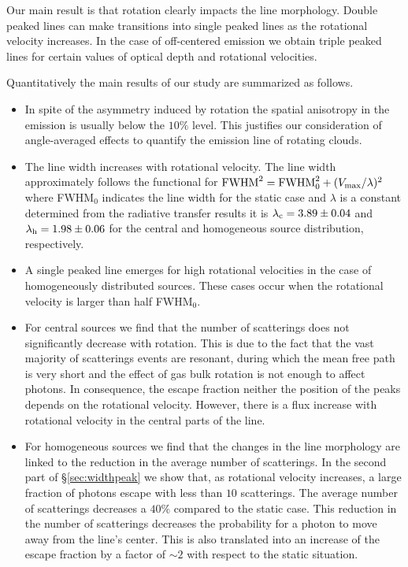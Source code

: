 \documentclass{emulateapj}
\newcommand{\ly}{{\ifmmode{{\rm Ly}\alpha~}\else{Ly$\alpha$~}\fi}}
\begin{document}
Our main result is that rotation clearly impacts the \ly line
morphology. Double peaked lines can make transitions into single
peaked lines as the rotational velocity increases. In the case of
off-centered emission we obtain triple peaked lines for certain
values of optical depth and rotational velocities. 

Quantitatively the main results of our study are summarized as follows.

\begin{itemize}

\item In spite of the asymmetry induced by rotation the spatial
  anisotropy in the emission is usually below the
  $10\%$ level. This justifies our consideration of angle-averaged
  effects to quantify the emission line of rotating clouds. 

\item The line width increases with rotational velocity. The line width
  approximately follows the functional for  ${\rm FWHM}^2 = {\rm FWHM}_{
    0}^2 + (V_{\rm max}/\lambda)^2$ where FWHM$_{0}$ indicates the line
  width for the static case and $\lambda$ is a constant determined from
  the radiative transfer results it is $\lambda_{\rm c}=3.89\pm0.04$ and
  $\lambda_{\rm h}=1.98\pm0.06$ for the central and homogeneous source
  distribution, respectively.

\item A single peaked line emerges for high rotational velocities in
  the case of homogeneously distributed sources. These cases occur when
  the rotational velocity is larger than half FWHM$_0$.  

\item For central sources we find that the number of scatterings
does not significantly decrease with rotation. This is due to the 
fact that the vast majority of scatterings events are resonant, 
during which the mean free path is very short and the effect of gas
bulk rotation is not enough to affect \ly photons. In consequence, 
the escape fraction neither the position of the peaks depends on the
rotational velocity. However, there is a flux increase with rotational
velocity in the central parts of the line.

\item For homogeneous sources we find that the changes in the
line morphology are linked to the reduction in the average number of
scatterings. In the second part of \S \ref{sec:widthpeak} we show
that, as rotational velocity increases, a large fraction of photons
escape with less than $10$ scatterings. The average number of
scatterings decreases a $40\%$ compared to the static case. 
This reduction in the number of scatterings decreases the probability
for a photon to move away from the line's center. This is also
translated into an increase of the escape fraction by a factor of
$\sim 2$ with respect to the static situation.

\end{itemize}
\end{document}

